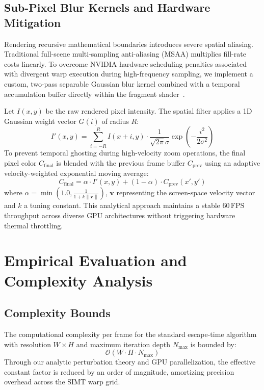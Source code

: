 \documentclass[10pt,journal,compsoc]{IEEEtran}
\begin{document}
\subsection{Sub-Pixel Blur Kernels and Hardware Mitigation}
Rendering recursive mathematical boundaries introduces severe spatial aliasing. Traditional full-scene multi-sampling anti-aliasing (MSAA) multiplies fill-rate costs linearly. To overcome NVIDIA hardware scheduling penalties associated with divergent warp execution during high-frequency sampling, we implement a custom, two-pass separable Gaussian blur kernel combined with a temporal accumulation buffer directly within the fragment shader~\cite{porter1984compositing}.

Let $I(x,y)$ be the raw rendered pixel intensity. The spatial filter applies a 1D Gaussian weight vector $G(i)$ of radius $R$:
\begin{equation}
I'(x,y) = \sum_{i=-R}^{R} I(x + i, y) \cdot \frac{1}{\sqrt{2\pi}\sigma} \exp\left(-\frac{i^2}{2\sigma^2}\right)
\end{equation}
To prevent temporal ghosting during high-velocity zoom operations, the final pixel color $C_{\text{final}}$ is blended with the previous frame buffer $C_{\text{prev}}$ using an adaptive velocity-weighted exponential moving average:
\begin{equation}
C_{\text{final}} = \alpha \cdot I'(x,y) + (1 - \alpha) \cdot C_{\text{prev}}(x', y')
\end{equation}
where $\alpha = \min\left(1.0, \frac{1}{1 + k \|\mathbf{v}\|}\right)$, $\mathbf{v}$ representing the screen-space velocity vector and $k$ a tuning constant. This analytical approach maintains a stable $60\,\text{FPS}$ throughput across diverse GPU architectures without triggering hardware thermal throttling.

\section{Empirical Evaluation and Complexity Analysis}
\subsection{Complexity Bounds}
The computational complexity per frame for the standard escape-time algorithm with resolution $W \times H$ and maximum iteration depth $N_{\text{max}}$ is bounded by:
\begin{equation}
\mathcal{O}(W \cdot H \cdot N_{\text{max}})
\end{equation}
Through our analytic perturbation theory and GPU parallelization, the effective constant factor is reduced by an order of magnitude, amortizing precision overhead across the SIMT warp grid.
\end{document}
